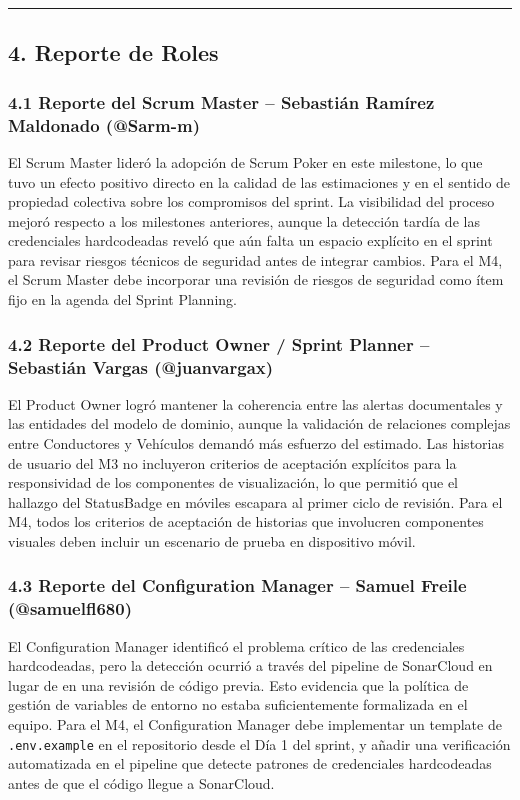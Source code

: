 \documentclass[11pt,a4paper]{article}
\begin{document}
\vspace{0.6em}\hrule\vspace{0.8em}

\subsection{4. Reporte de Roles}

\subsubsection{4.1 Reporte del Scrum Master -- Sebastián Ramírez Maldonado (@Sarm-m)}

El Scrum Master lideró la adopción de Scrum Poker en este milestone, lo que tuvo un efecto positivo directo en la calidad de las estimaciones y en el sentido de propiedad colectiva sobre los compromisos del sprint. La visibilidad del proceso mejoró respecto a los milestones anteriores, aunque la detección tardía de las credenciales hardcodeadas reveló que aún falta un espacio explícito en el sprint para revisar riesgos técnicos de seguridad antes de integrar cambios. Para el M4, el Scrum Master debe incorporar una revisión de riesgos de seguridad como ítem fijo en la agenda del Sprint Planning.

\subsubsection{4.2 Reporte del Product Owner / Sprint Planner -- Sebastián Vargas (@juanvargax)}

El Product Owner logró mantener la coherencia entre las alertas documentales y las entidades del modelo de dominio, aunque la validación de relaciones complejas entre Conductores y Vehículos demandó más esfuerzo del estimado. Las historias de usuario del M3 no incluyeron criterios de aceptación explícitos para la responsividad de los componentes de visualización, lo que permitió que el hallazgo del StatusBadge en móviles escapara al primer ciclo de revisión. Para el M4, todos los criterios de aceptación de historias que involucren componentes visuales deben incluir un escenario de prueba en dispositivo móvil.

\subsubsection{4.3 Reporte del Configuration Manager -- Samuel Freile (@samuelfl680)}

El Configuration Manager identificó el problema crítico de las credenciales hardcodeadas, pero la detección ocurrió a través del pipeline de SonarCloud en lugar de en una revisión de código previa. Esto evidencia que la política de gestión de variables de entorno no estaba suficientemente formalizada en el equipo. Para el M4, el Configuration Manager debe implementar un template de \texttt{.env.example} en el repositorio desde el Día 1 del sprint, y añadir una verificación automatizada en el pipeline que detecte patrones de credenciales hardcodeadas antes de que el código llegue a SonarCloud.
\end{document}
